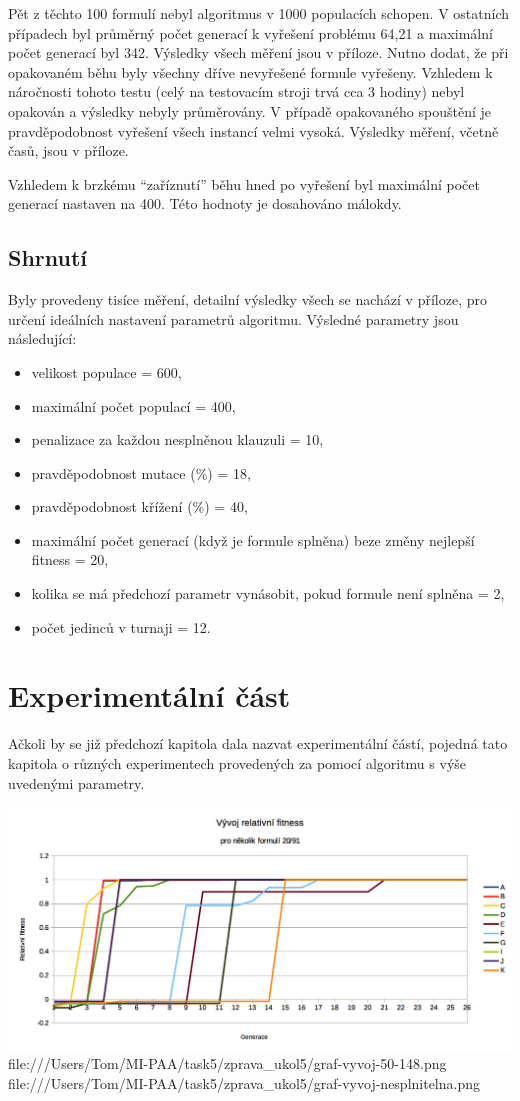 \documentclass[a4paper]{article}
\begin{document}
	Pět z těchto 100 formulí nebyl algoritmus v 1000 populacích schopen. V ostatních případech byl průměrný počet generací k vyřešení problému 64,21 a maximální počet generací byl 342. Výsledky všech měření jsou v příloze. Nutno dodat, že při opakovaném běhu byly všechny dříve nevyřešené formule vyřešeny. Vzhledem k náročnosti tohoto testu (celý na testovacím stroji trvá cca 3 hodiny) nebyl opakován a výsledky nebyly průměrovány. V případě opakovaného spouštění je pravděpodobnost vyřešení všech instancí velmi vysoká. Výsledky měření, včetně časů, jsou v příloze.
	
	Vzhledem k brzkému \enquote{zaříznutí} běhu hned po vyřešení byl maximální počet generací nastaven na 400. Této hodnoty je dosahováno málokdy.
	
	\subsection{Shrnutí}
		Byly provedeny tisíce měření, detailní výsledky všech se nachází v příloze, pro určení ideálních nastavení parametrů algoritmu. Výsledné parametry jsou následující:
		\begin{itemize}
		\item velikost populace = 600,
		\item maximální počet populací = 400,
		\item penalizace za každou nesplněnou klauzuli = 10,
		\item pravděpodobnost mutace (\%) = 18,
		\item pravděpodobnost křížení (\%) = 40,
		\item maximální počet generací (když je formule splněna) beze změny nejlepší fitness = 20,
		\item kolika se má předchozí parametr vynásobit, pokud formule není splněna = 2,
		\item počet jedinců v turnaji = 12.
	\end{itemize}
	

\section{Experimentální část}
	Ačkoli by se již předchozí kapitola dala nazvat experimentální částí, pojedná tato kapitola o různých experimentech provedených za pomocí algoritmu s výše uvedenými parametry.
	
	\includegraphics[scale=1]{graf-vyvoj-20-91.png} 
file:///Users/Tom/MI-PAA/task5/zprava_ukol5/graf-vyvoj-50-148.png
file:///Users/Tom/MI-PAA/task5/zprava_ukol5/graf-vyvoj-nesplnitelna.png
\end{document}
